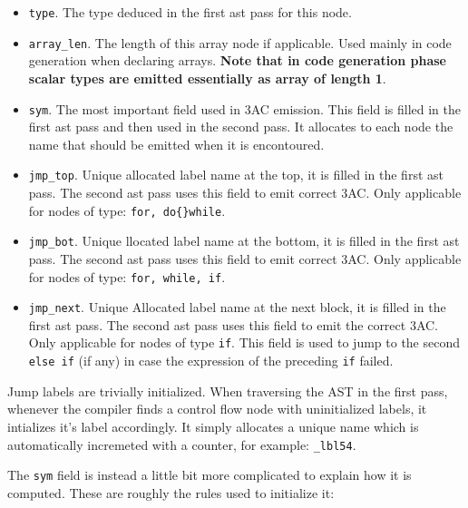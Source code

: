 \documentclass[a4paper]{article}
\begin{document}
\begin{itemize}
\item \texttt{type}. The type deduced in the first ast pass for this node.
\item \texttt{array\_len}. The length of this array node if applicable. Used mainly in code generation when
  declaring arrays. \textbf{Note that in code generation phase scalar types are emitted essentially as array of length 1}.
\item \texttt{sym}. The most important field used in 3AC emission. This field is filled in the first ast pass and then used in the second pass. It allocates to each node the name
  that should be emitted when it is encontoured.
\item \texttt{jmp\_top}. Unique allocated label name at the top, it is filled in the first ast pass. The second ast pass
  uses this field to emit correct 3AC. Only applicable for nodes of type: \texttt{for, do\{\}while}.
\item \texttt{jmp\_bot}. Unique llocated label name at the bottom, it is filled in the first ast pass. The second ast pass
  uses this field to emit correct 3AC. Only applicable for nodes of type: \texttt{for, while, if}.
\item \texttt{jmp\_next}. Unique Allocated label name at the next block, it is filled in the first ast pass. The second ast pass
  uses this field to emit the correct 3AC. Only applicable for nodes of type \texttt{if}. This field
  is used to jump to the second \texttt{else if} (if any) in case the expression of the preceding \texttt{if} failed.
\end{itemize}

Jump labels are trivially initialized. When traversing the AST in the first pass, whenever the compiler
finds a control flow node with uninitialized labels, it intializes it's label accordingly. It simply allocates
a unique name which is automatically incremeted with a counter, for example: \texttt{\_lbl54}.

The \texttt{sym} field is instead a little bit more complicated to explain how it is computed. These are roughly the rules used to initialize it:
\end{document}
